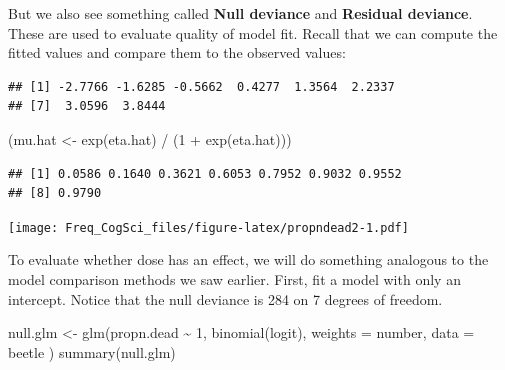 \documentclass[
  12pt,
]{krantz}
\newenvironment{Shaded}{\begin{snugshade}}{\end{snugshade}}
\newcommand{\AttributeTok}[1]{\textcolor[rgb]{0.77,0.63,0.00}{#1}}
\newcommand{\CommentTok}[1]{\textcolor[rgb]{0.56,0.35,0.01}{\textit{#1}}}
\newcommand{\DecValTok}[1]{\textcolor[rgb]{0.00,0.00,0.81}{#1}}
\newcommand{\FloatTok}[1]{\textcolor[rgb]{0.00,0.00,0.81}{#1}}
\newcommand{\FunctionTok}[1]{\textcolor[rgb]{0.00,0.00,0.00}{#1}}
\newcommand{\NormalTok}[1]{#1}
\newcommand{\OtherTok}[1]{\textcolor[rgb]{0.56,0.35,0.01}{#1}}
\newcommand{\SpecialCharTok}[1]{\textcolor[rgb]{0.00,0.00,0.00}{#1}}
\theoremstyle{definition}
\theoremstyle{definition}
\theoremstyle{definition}
\theoremstyle{definition}
\theoremstyle{remark}
\begin{document}
But we also see something called \textbf{Null deviance} and \textbf{Residual deviance}. These are used to evaluate quality of model fit. Recall that we can compute the fitted values and compare them to the observed values:

\begin{Shaded}
\end{Shaded}

\begin{verbatim}
## [1] -2.7766 -1.6285 -0.5662  0.4277  1.3564  2.2337
## [7]  3.0596  3.8444
\end{verbatim}

\begin{Shaded}
\begin{Highlighting}[]
\NormalTok{(mu.hat }\OtherTok{\textless{}{-}} \FunctionTok{exp}\NormalTok{(eta.hat) }\SpecialCharTok{/}\NormalTok{ (}\DecValTok{1} \SpecialCharTok{+} \FunctionTok{exp}\NormalTok{(eta.hat)))}
\end{Highlighting}
\end{Shaded}

\begin{verbatim}
## [1] 0.0586 0.1640 0.3621 0.6053 0.7952 0.9032 0.9552
## [8] 0.9790
\end{verbatim}

\begin{Shaded}
\end{Shaded}

\texttt{[image: Freq\_CogSci\_files/figure-latex/propndead2-1.pdf]}

To evaluate whether dose has an effect, we will do something analogous to the model comparison methods we saw earlier. First, fit a model with only an intercept. Notice that the null deviance is 284 on 7 degrees of freedom.

\begin{Shaded}
\begin{Highlighting}[]
\NormalTok{null.glm }\OtherTok{\textless{}{-}} \FunctionTok{glm}\NormalTok{(propn.dead }\SpecialCharTok{\textasciitilde{}} \DecValTok{1}\NormalTok{, }\FunctionTok{binomial}\NormalTok{(logit),}
  \AttributeTok{weights =}\NormalTok{ number, }\AttributeTok{data =}\NormalTok{ beetle}
\NormalTok{)}
\FunctionTok{summary}\NormalTok{(null.glm)}
\end{Highlighting}
\end{Shaded}
\end{document}
